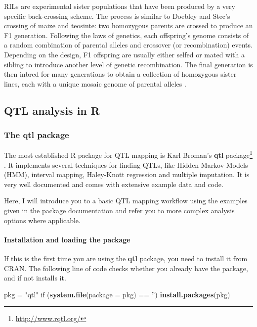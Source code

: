 \documentclass[12pt,]{krantz}
\newenvironment{Shaded}{\begin{snugshade}}{\end{snugshade}}
\newcommand{\KeywordTok}[1]{\textcolor[rgb]{0.27,0.27,0.27}{\textbf{{#1}}}}
\newcommand{\DataTypeTok}[1]{\textcolor[rgb]{0.27,0.27,0.27}{{#1}}}
\newcommand{\StringTok}[1]{\textcolor[rgb]{0.5,0.5,0.5}{{#1}}}
\newcommand{\NormalTok}[1]{{#1}}
\let\oldparagraph\paragraph
\renewcommand{\paragraph}[1]{\oldparagraph{#1}\mbox{}}
\renewcommand{\href}[2]{#2\footnote{\url{#1}}}
\theoremstyle{definition}
\theoremstyle{definition}
\theoremstyle{remark}
\begin{document}
RILs are experimental sister populations that have been produced by a
very specific back-crossing scheme. The process is similar to Doebley
and Stec's crossing of maize and teosinte: two homozygous parents are
crossed to produce an F1 generation. Following the laws of genetics,
each offspring's genome consists of a random combination of parental
alleles and crossover (or recombination) events. Depending on the
design, F1 offspring are usually either selfed or mated with a sibling
to introduce another level of genetic recombination. The final
generation is then inbred for many generations to obtain a collection of
homozygous sister lines, each with a unique mosaic genome of parental
alleles \citep{Pollard2012}.

\subsection{QTL analysis in R}\label{qtl-analysis-in-r}

\subsubsection{The qtl package}\label{the-qtl-package}

The most established R package for QTL mapping is Karl Broman's
\href{http://www.rqtl.org/}{\textbf{qtl} package}
\citep{R-qtl}. It implements several techniques for finding QTLs, like
Hidden Markov Models (HMM), interval mapping, Haley-Knott regression and
multiple imputation. It is very well documented and comes with extensive
example data and code.

Here, I will introduce you to a basic QTL mapping workflow using the
examples given in the package documentation and refer you to more
complex analysis options where applicable.

\paragraph{Installation and loading the
package}\label{installation-and-loading-the-package}

If this is the first time you are using the \textbf{qtl}
package, you need to install it from CRAN. The following line of code
checks whether you already have the package, and if not installs it.

\begin{Shaded}
\begin{Highlighting}[]
\NormalTok{pkg =}\StringTok{ "qtl"}
\NormalTok{if (}\KeywordTok{system.file}\NormalTok{(}\DataTypeTok{package =} \NormalTok{pkg) ==}\StringTok{ ''}\NormalTok{) }\KeywordTok{install.packages}\NormalTok{(pkg)}
\end{Highlighting}
\end{Shaded}
\end{document}

